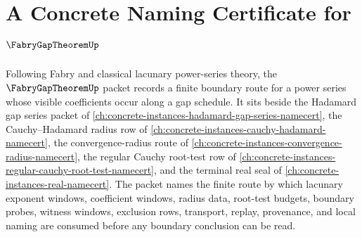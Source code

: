 \chapter{A Concrete Naming Certificate for $\FabryGapTheoremUp$}
\label{ch:concrete-instances-fabry-gap-theorem-namecert}

Following Fabry and classical lacunary power-series theory, the $\FabryGapTheoremUp$ packet records a finite boundary route for a power series whose visible coefficients occur along a gap schedule. It sits beside the Hadamard gap series packet of \autoref{ch:concrete-instances-hadamard-gap-series-namecert}, the Cauchy--Hadamard radius row of \autoref{ch:concrete-instances-cauchy-hadamard-namecert}, the convergence-radius route of \autoref{ch:concrete-instances-convergence-radius-namecert}, the regular Cauchy root-test row of \autoref{ch:concrete-instances-regular-cauchy-root-test-namecert}, and the terminal real seal of \autoref{ch:concrete-instances-real-namecert}. The packet names the finite route by which lacunary exponent windows, coefficient windows, radius data, root-test budgets, boundary probes, witness windows, exclusion rows, transport, replay, provenance, and local naming are consumed before any boundary conclusion can be read.

